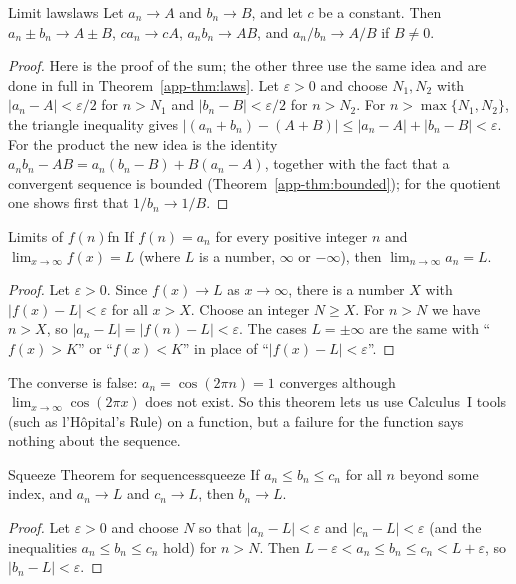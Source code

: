 \documentclass[11pt]{article}
\begin{document}
\begin{thm}{Limit laws}{laws}
Let $a_n\to A$ and $b_n\to B$, and let $c$ be a constant. Then $a_n\pm b_n\to A\pm B$, $ca_n\to cA$, $a_nb_n\to AB$, and $a_n/b_n\to A/B$ if $B\ne0$.
\end{thm}
\begin{proof}
Here is the proof of the sum; the other three use the same idea and are done in full in Theorem~\ref{app-thm:laws}. Let $\varepsilon>0$ and choose $N_1,N_2$ with $|a_n-A|<\varepsilon/2$ for $n>N_1$ and $|b_n-B|<\varepsilon/2$ for $n>N_2$. For $n>\max\{N_1,N_2\}$, the triangle inequality gives $|(a_n+b_n)-(A+B)|\le|a_n-A|+|b_n-B|<\varepsilon$. For the product the new idea is the identity $a_nb_n-AB=a_n(b_n-B)+B(a_n-A)$, together with the fact that a convergent sequence is bounded (Theorem~\ref{app-thm:bounded}); for the quotient one shows first that $1/b_n\to1/B$.
\end{proof}

\begin{thm}{Limits of $f(n)$}{fn}
If $f(n)=a_n$ for every positive integer $n$ and $\lim_{x\to\infty}f(x)=L$ (where $L$ is a number, $\infty$ or $-\infty$), then $\lim_{n\to\infty}a_n=L$.
\end{thm}
\begin{proof}
Let $\varepsilon>0$. Since $f(x)\to L$ as $x\to\infty$, there is a number $X$ with $|f(x)-L|<\varepsilon$ for all $x>X$. Choose an integer $N\ge X$. For $n>N$ we have $n>X$, so $|a_n-L|=|f(n)-L|<\varepsilon$. The cases $L=\pm\infty$ are the same with ``$f(x)>K$'' or ``$f(x)<K$'' in place of ``$|f(x)-L|<\varepsilon$''.
\end{proof}

The converse is false: $a_n=\cos(2\pi n)=1$ converges although $\lim_{x\to\infty}\cos(2\pi x)$ does not exist. So this theorem lets us use Calculus~I tools (such as l'H\^opital's Rule) on a function, but a failure for the function says nothing about the sequence.

\begin{thm}{Squeeze Theorem for sequences}{squeeze}
If $a_n\le b_n\le c_n$ for all $n$ beyond some index, and $a_n\to L$ and $c_n\to L$, then $b_n\to L$.
\end{thm}
\begin{proof}
Let $\varepsilon>0$ and choose $N$ so that $|a_n-L|<\varepsilon$ and $|c_n-L|<\varepsilon$ (and the inequalities $a_n\le b_n\le c_n$ hold) for $n>N$. Then $L-\varepsilon<a_n\le b_n\le c_n<L+\varepsilon$, so $|b_n-L|<\varepsilon$.
\end{proof}
\end{document}
